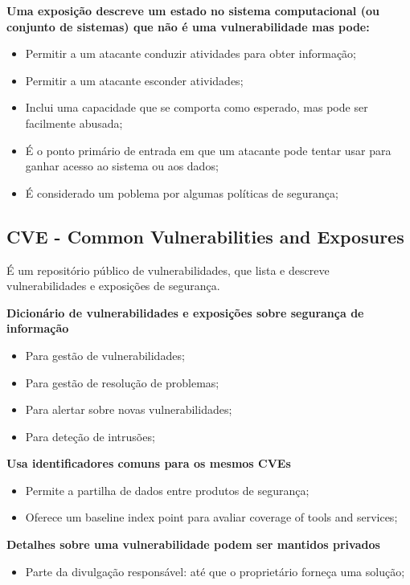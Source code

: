 \documentclass{article}
\begin{document}
  \textbf{Uma exposição descreve um estado no sistema computacional (ou conjunto de sistemas)
  que não é uma vulnerabilidade mas pode:}
  \begin{itemize}
    \item Permitir a um atacante conduzir atividades para obter informação;
    \item Permitir a um atacante esconder atividades;
    \item Inclui uma capacidade que se comporta como esperado, mas pode ser
    facilmente abusada;
    \item É o ponto primário de entrada em que um atacante pode tentar
    usar para ganhar acesso ao sistema ou aos dados;
    \item É considerado um poblema por algumas políticas de segurança;
  \end{itemize}

  \subsection{CVE - Common Vulnerabilities and Exposures}

  É um repositório público de vulnerabilidades, que lista e descreve vulnerabilidades e
  exposições de segurança.

  \vspace{2mm}

  \textbf{Dicionário de vulnerabilidades e exposições sobre segurança de informação}
  \begin{itemize}
    \item Para gestão de vulnerabilidades;
    \item Para gestão de resolução de problemas;
    \item Para alertar sobre novas vulnerabilidades;
    \item Para deteção de intrusões;
  \end{itemize}

  \pagebreak

  \textbf{Usa identificadores comuns para os mesmos CVEs}
  \begin{itemize}
    \item Permite a partilha de dados entre produtos de segurança;
    \item Oferece um baseline index point para avaliar coverage of
    tools and services;
  \end{itemize}

  \textbf{Detalhes sobre uma vulnerabilidade podem ser mantidos privados}
  \begin{itemize}
    \item Parte da divulgação responsável: até que o proprietário forneça uma solução;
  \end{itemize}
\end{document}
